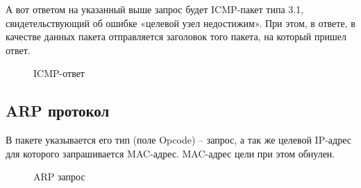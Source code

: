 \documentclass[a4paper, 14pt,russian]{article}
\begin{document}
	А вот ответом на указанный выше запрос будет ICMP-пакет типа 3.1, свидетельствующий об ошибке «целевой узел недостижим». При этом, в ответе, в качестве данных пакета отправляется заголовок того пакета, на который пришел ответ.
	\newpage
	\begin{figure}[h!]
		\caption{ICMP-ответ}
		\label{img:error_ping2}
	\end{figure}


\subsection{ARP протокол}
В пакете указывается его тип (поле Opcode) – запрос, а так же целевой IP-адрес для которого запрашивается MAC-адрес. MAC-адрес цели при этом обнулен.

\begin{figure}[h!]
	\caption{ARP запрос}
	\label{img:arp_req}
\end{figure}
\end{document}
